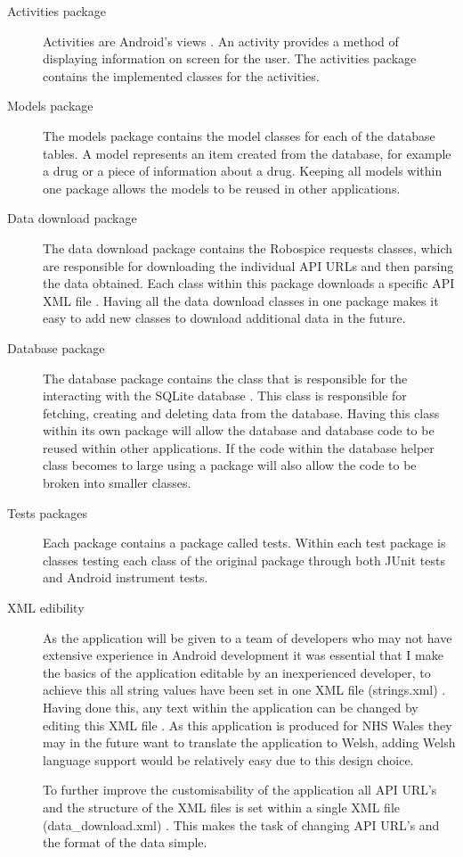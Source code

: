 \begin{description}
	\item[Activities package] Activities are Android's views \cite{android}. An activity provides a method of displaying information on screen for the user. The activities package contains the implemented classes for the activities. 
	\item[Models package] The models package contains the model classes for each of the database tables. A model represents an item created from the database, for example a drug or a piece of information about a drug. Keeping all models within one package allows the models to be reused in other applications.
	\item[Data download package] The data download package contains the Robospice \cite{robospice} requests classes, which are responsible for downloading the individual API URLs and then parsing the data obtained. Each class within this package downloads a specific API XML file \cite{xml}. Having all the data download classes in one package makes it easy to add new classes to download additional data in the future.
	\item[Database package] The database package contains the class that is responsible for the interacting with the SQLite database \cite{sqlite}. This class is responsible for fetching, creating and deleting data from the database. Having this class within its own package will allow the database and database code to be reused within other applications. If the code within the database helper class becomes to large using a package will also allow the code to be broken into smaller classes.
	\item[Tests packages] Each package contains a package called tests. Within each test package is classes testing each class of the original package through both JUnit \cite{junit} tests and Android instrument tests.
	\item[XML edibility] As the application will be given to a team of developers who may not have extensive experience in Android development it was essential that I make the basics of the application editable by an inexperienced developer, to achieve this all string values have been set in one XML file (strings.xml) \cite{strings_xml}. Having done this, any text within the application can be changed by editing this XML file \cite{xml}. As this application is produced for NHS Wales \cite{nhs_website} they may in the future want to translate the application to Welsh, adding Welsh language support would be relatively easy due to this design choice.

	To further improve the customisability of the application all API URL's and the structure of the XML files is set within a single XML file (data\_download.xml) \cite{strings_xml}. This makes the task of changing API URL's and the format of the data simple.

\end{description}

